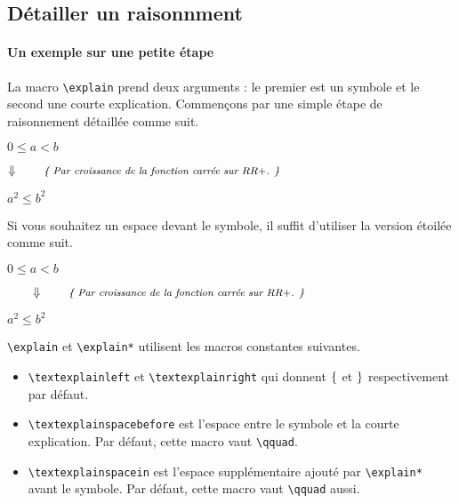 \documentclass[12pt,a4paper]{article}
\newcommand\RRp{RR+}
\newcommand\vimplies{\Downarrow}
\begin{document}

    \subsection{Détailler un raisonnment} \label{explain-proof}
    
	    \paragraph{Un exemple sur une petite étape}
    
La macro \verb+\explain+ prend deux arguments : le premier est un symbole et le second une courte explication. Commençons par une simple étape de raisonnement détaillée comme suit.

\begin{tcblisting}{}
$0 \leq a < b$

$\explain{\vimplies}{Par croissance de la fonction carrée sur $\RRp$.}$

$a^2 \leq b^2$
\end{tcblisting}

Si vous souhaitez un espace devant le symbole, il suffit d'utiliser la version étoilée comme suit.

\begin{tcblisting}{}
$0 \leq a < b$

$\explain*{\vimplies}{Par croissance de la fonction carrée sur $\RRp$.}$

$a^2 \leq b^2$
\end{tcblisting}
	

\verb+\explain+ et \verb+\explain*+ utilisent les macros constantes suivantes.
\begin{itemize}
	\item \verb+\textexplainleft+ et \verb+\textexplainright+ qui donnent $\{$ et $\}$ respectivement par défaut.
	
	\item \verb+\textexplainspacebefore+ est l'espace entre le symbole et la courte explication. Par défaut, cette macro vaut \verb+\qquad+.
	
	\item \verb+\textexplainspacein+ est l'espace supplémentaire ajouté par \verb+\explain*+ avant le symbole. Par défaut, cette macro vaut \verb+\qquad+ aussi.	
\end{itemize}
\end{document}
